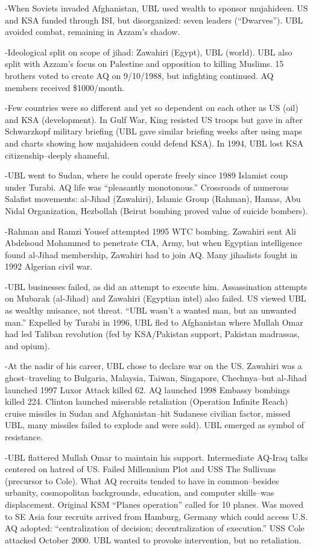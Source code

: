 \documentclass[
]{article}
\begin{document}
-When Soviets invaded Afghanistan, UBL used wealth to sponsor
mujahideen. US and KSA funded through ISI, but disorganized: seven
leaders (``Dwarves''). UBL avoided combat, remaining in Azzam's shadow.

-Ideological split on scope of jihad: Zawahiri (Egypt), UBL (world). UBL
also split with Azzam's focus on Palestine and opposition to killing
Muslims. 15 brothers voted to create AQ on 9/10/1988, but infighting
continued. AQ members received \$1000/month.

-Few countries were so different and yet so dependent on each other as
US (oil) and KSA (development). In Gulf War, King resisted US troops but
gave in after Schwarzkopf military briefing (UBL gave similar briefing
weeks after using maps and charts showing how mujahideen could defend
KSA). In 1994, UBL lost KSA citizenship--deeply shameful.

-UBL went to Sudan, where he could operate freely since 1989 Islamist
coup under Turabi. AQ life was ``pleasantly monotonous.'' Crossroads of
numerous Salafist movements: al-Jihad (Zawahiri), Islamic Group
(Rahman), Hamas, Abu Nidal Organization, Hezbollah (Beirut bombing
proved value of suicide bombers).

-Rahman and Ramzi Yousef attempted 1995 WTC bombing. Zawahiri sent Ali
Abdelsoud Mohammed to penetrate CIA, Army, but when Egyptian
intelligence found al-Jihad membership, Zawahiri had to join AQ. Many
jihadists fought in 1992 Algerian civil war.

-UBL businesses failed, as did an attempt to execute him. Assassination
attempts on Mubarak (al-Jihad) and Zawahiri (Egyptian intel) also
failed. US viewed UBL as wealthy nuisance, not threat. ``UBL wasn't a
wanted man, but an unwanted man.'' Expelled by Turabi in 1996, UBL fled
to Afghanistan where Mullah Omar had led Taliban revolution (fed by
KSA/Pakistan support, Pakistan madrassas, and opium).

-At the nadir of his career, UBL chose to declare war on the US.
Zawahiri was a ghost--traveling to Bulgaria, Malaysia, Taiwan,
Singapore, Chechnya--but al-Jihad launched 1997 Luxor Attack killed 62.
AQ launched 1998 Embassy bombings killed 224. Clinton launched miserable
retaliation (Operation Infinite Reach) cruise missiles in Sudan and
Afghanistan--hit Sudanese civilian factor, missed UBL, many missiles
failed to explode and were sold). UBL emerged as symbol of resistance.

-UBL flattered Mullah Omar to maintain his support. Intermediate AQ-Iraq
talks centered on hatred of US. Failed Millennium Plot and USS The
Sullivans (precursor to Cole). What AQ recruits tended to have in
common--besides urbanity, cosmopolitan backgrounds, education, and
computer skills--was displacement. Original KSM ``Planes operation''
called for 10 planes. Was moved to SE Asia four recruits arrived from
Hamburg, Germany which could access U.S. AQ adopted: ``centralization of
decision; decentralization of execution.'' USS Cole attacked October
2000. UBL wanted to provoke intervention, but no retaliation.
\end{document}
